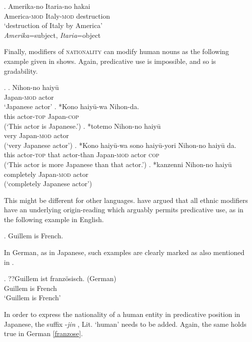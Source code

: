 \exg. Amerika-no Itaria-no hakai \label{sub-ob}\\
America-\textsc{mod} Italy-\textsc{mod} destruction\\
`destruction of Italy by America’ \\ \null \hfill \textit{Amerika}=subject, \textit{Itaria}=object

Finally, modifiers of \textsc{nationality} can modify human nouns as the following example given in \citet[91]{morita:2011:three} shows. Again, predicative use is impossible, and so is gradability.

\ex. \ag. Nihon-no haiyū\\
Japan-\textsc{mod} actor\\
`Japanese actor'
\bg. *Kono haiyū-wa Nihon-da.\\
this actor-\textsc{top} Japan-\textsc{cop}\\
(`This actor is Japanese.’)
\cg. *totemo Nihon-no haiyū\\
very Japan-\textsc{mod} actor\\
(`very Japanese actor’)
\dg. *Kono haiyū-wa sono haiyū-yori Nihon-no haiyū da.\\
this actor-\textsc{top} that actor-than Japan-\textsc{mod} actor \textsc{cop}\\
(`This actor is more Japanese than that actor.’)
\eg. *kanzenni Nihon-no haiyū\\
completely Japan-\textsc{mod} actor\\
(`completely Japanese actor’)

This might be different for other languages. \citet{arseni:2014:EA} have argued that all ethnic modifiers have an underlying origin-reading which arguably permits predicative use, as in the following example in  English.

\ex. Guillem is French. \hfill \citep[23]{arseni:2014:EA}

In  German, as in Japanese, such examples are clearly marked as also mentioned in \citet{kotowski:2016:adj}. %

\exg. ??Guillem ist französisch. (German)\\
Guillem is French\\
`Guillem is French’

In order to express the nationality of a human entity in predicative position in Japanese, the suffix -\textit{jin} , Lit. `human' needs to be added. Again, the same holds true in German \ref{franzose}. 


